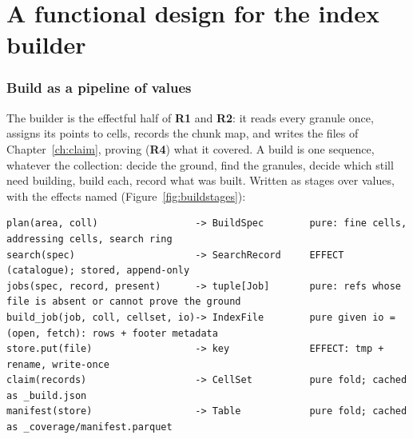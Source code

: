 \documentclass[10pt,a4paper]{article}
\newcommand{\req}[1]{\textbf{R#1}}
\begin{document}
\clearpage
\part{A functional design for the index builder}
\label{part:build}

\section{Build as a pipeline of values}
\label{ch:buildvalues}

The builder is the effectful half of \req{1} and \req{2}: it reads every granule once, assigns its points to
cells, records the chunk map, and writes the files of Chapter~\ref{ch:claim}, proving (\req{4}) what it covered.
A build is one sequence, whatever the collection: decide the ground, find the granules, decide which still need
building, build each, record what was built. Written as stages over values, with the effects named
(Figure~\ref{fig:buildstages}):

\begin{Verbatim}[fontsize=\footnotesize]
plan(area, coll)                 -> BuildSpec        pure: fine cells, addressing cells, search ring
search(spec)                     -> SearchRecord     EFFECT (catalogue); stored, append-only
jobs(spec, record, present)      -> tuple[Job]       pure: refs whose file is absent or cannot prove the ground
build_job(job, coll, cellset, io)-> IndexFile        pure given io = (open, fetch): rows + footer metadata
store.put(file)                  -> key              EFFECT: tmp + rename, write-once
claim(records)                   -> CellSet          pure fold; cached as _build.json
manifest(store)                  -> Table            pure fold; cached as _coverage/manifest.parquet
\end{Verbatim}
\end{document}
